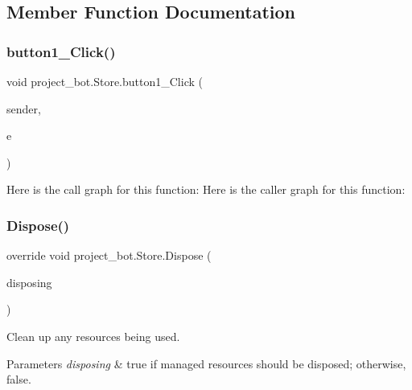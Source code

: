 \subsection{Member Function Documentation}
\mbox{\label{classproject__bot_1_1_store_a0a4530e8cbd5bb73b2e9c6aeb41b74d1}} 
\subsubsection{\texorpdfstring{button1\+\_\+\+Click()}{button1\_Click()}}
{\footnotesize\ttfamily void project\+\_\+bot.\+Store.\+button1\+\_\+\+Click (\begin{DoxyParamCaption}\item[{object}]{sender,  }\item[{Event\+Args}]{e }\end{DoxyParamCaption})\hspace{0.3cm}{\ttfamily [private]}}

Here is the call graph for this function\+:
Here is the caller graph for this function\+:
\mbox{\label{classproject__bot_1_1_store_abc4be67dcd1d8772c07baa6fe1a393eb}} 
\subsubsection{\texorpdfstring{Dispose()}{Dispose()}}
{\footnotesize\ttfamily override void project\+\_\+bot.\+Store.\+Dispose (\begin{DoxyParamCaption}\item[{bool}]{disposing }\end{DoxyParamCaption})\hspace{0.3cm}{\ttfamily [protected]}}



Clean up any resources being used. 


\begin{DoxyParams}{Parameters}
{\em disposing} & true if managed resources should be disposed; otherwise, false.\\
\hline
\end{DoxyParams}
\mbox{\label{classproject__bot_1_1_store_a4b1bdbb3b9e66dedb0ae4d7b91884cdf}} 

